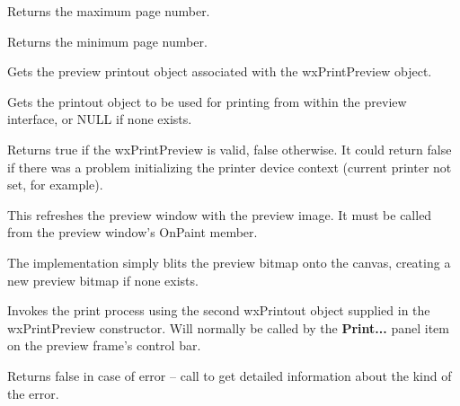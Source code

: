 
Returns the maximum page number.


\label{wxprintpreviewgetminpage}


Returns the minimum page number.


\label{wxprintpreviewgetprintout}


Gets the preview printout object associated with the wxPrintPreview object.


\label{wxprintpreviewgetprintoutforprinting}


Gets the printout object to be used for printing from within the preview interface,
or NULL if none exists.


\label{wxprintpreviewisok}


Returns true if the wxPrintPreview is valid, false otherwise. It could return false if there was a
problem initializing the printer device context (current printer not set, for example).


\label{wxprintpreviewpaintpage}


This refreshes the preview window with the preview image.
It must be called from the preview window's OnPaint member.

The implementation simply blits the preview bitmap onto
the canvas, creating a new preview bitmap if none exists.


\label{wxprintpreviewprint}


Invokes the print process using the second wxPrintout object
supplied in the wxPrintPreview constructor.
Will normally be called by the {\bf Print...} panel item on the
preview frame's control bar.

Returns false in case of error -- call
 to get detailed
information about the kind of the error.


